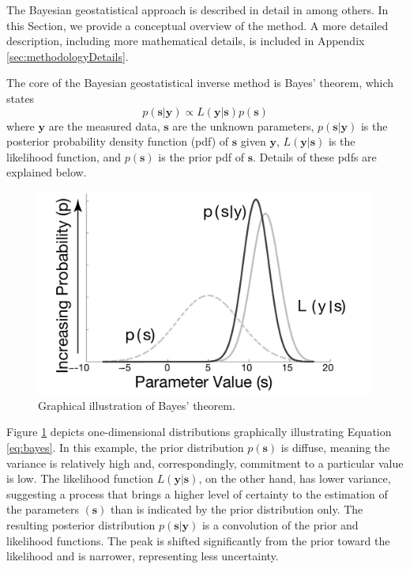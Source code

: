 \documentclass[11pt,oneside,onecolumn]{usgsreport}
\begin{document}
\begin{multicols}{2}

The Bayesian geostatistical approach is described in detail in \citet{KitanidisVomvoris1983,HoeksemaKitanidis1984a,Kitanidis1995,NowakCirpka2004}
among others. In this Section, we provide a conceptual overview of
the method. A more detailed description, including more mathematical
details, is included in Appendix \ref{sec:methodologyDetails}.

The core of the Bayesian geostatistical inverse method is Bayes' theorem,
which states
\begin{equation}
p(\mathbf{s|y})\propto L(\mathbf{y|s})p(\mathbf{s})\label{eq:bayes}
\end{equation}
 where \textbf{$\mathbf{y}$} are the measured data, $\mathbf{s}$
are the unknown parameters, $p(\mathbf{s|y})$ is the posterior probability
density function (pdf) of $\mathbf{s}$ given $\mathbf{y}$, $L(\mathbf{y|s})$
is the likelihood function, and $p(\mathbf{s})$ is the prior pdf
of $\mathbf{s}$. Details of these pdfs are explained below. 

\begin{figure}[!t]
\begin{centering}
\includegraphics[scale=0.55]{figures/normals}
\par\end{centering}

\caption{\label{fig:normals}Graphical illustration of Bayes' theorem.}
\end{figure}


Figure \ref{fig:normals} depicts one-dimensional distributions graphically
illustrating Equation \ref{eq:bayes}. In this example, the prior
distribution $p\left(\mathbf{s}\right)$ is diffuse, meaning the variance
is relatively high and, correspondingly, commitment to a particular
value is low. The likelihood function $L\left(\mathbf{y|s}\right)$,
on the other hand, has lower variance, suggesting a process that brings
a higher level of certainty to the estimation of the parameters $\left(\mathbf{s}\right)$
than is indicated by the prior distribution only. The resulting posterior
distribution $p\left(\mathbf{s|y}\right)$ is a convolution of the
prior and likelihood functions. The peak is shifted significantly
from the prior toward the likelihood and is narrower, representing
less uncertainty.


\end{multicols}
\end{document}
